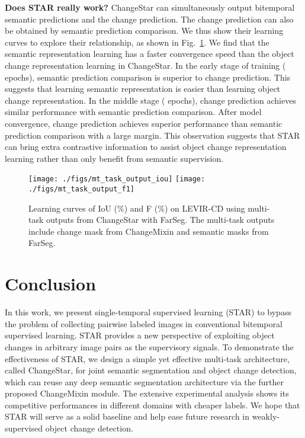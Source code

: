 \documentclass[10pt,twocolumn,letterpaper]{article}
\begin{document}
\noindent\textbf{Does STAR really work?}
ChangeStar can simultaneously output bitemporal semantic predictions and the change prediction.
The change prediction can also be obtained by semantic prediction comparison.
We thus show their learning curves to explore their relationship, as shown in Fig.~\ref{fig:multitask_output}.
We find that the semantic representation learning has a faster convergence speed than the object change representation learning in ChangeStar.
In the early stage of training ( epochs), semantic prediction comparison is superior to change prediction.
This suggests that learning semantic representation is easier than learning object change representation.
In the middle stage ( epochs), change prediction achieves similar performance with semantic prediction comparison.
After model convergence, change prediction achieves superior performance than semantic prediction comparison with a large margin.
This observation suggests that STAR can bring extra contrastive information to assist object change representation learning rather than only benefit from semantic supervision.




\begin{figure}
    \begin{center}
        \texttt{[image: ./figs/mt\_task\_output\_iou]}
        \texttt{[image: ./figs/mt\_task\_output\_f1]}
    \end{center}
    \vspace{-0.2in}
    \caption{Learning curves of IoU (\%) and F (\%) on LEVIR-CD using multi-task outputs from ChangeStar with FarSeg.
        The multi-task outputs include change mask from ChangeMixin and semantic masks from FarSeg.
    }
    \label{fig:multitask_output}\vspace{-4mm}
\end{figure}

\section{Conclusion}
\label{sec:conc}
In this work, we present single-temporal supervised learning (STAR) to bypass the problem of collecting pairwise labeled images in conventional bitemporal supervised learning.
STAR provides a new perspective of exploiting object changes in arbitrary image pairs as the supervisory signals.
To demonstrate the effectiveness of STAR, we design a simple yet effective multi-task architecture, called ChangeStar, for joint semantic segmentation and object change detection, which can reuse any deep semantic segmentation architecture via the further proposed ChangeMixin module.
The extensive experimental analysis shows its competitive performances in different domains with cheaper labels.
We hope that STAR will serve as a solid baseline and help ease future research in weakly-supervised object change detection.
\end{document}
